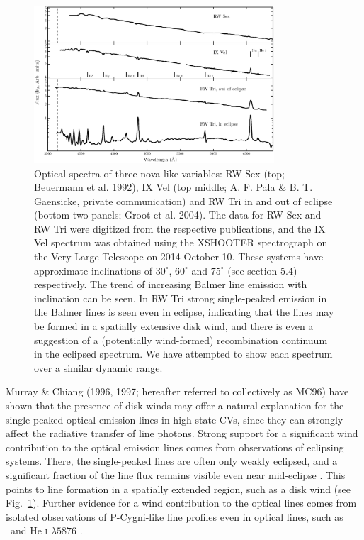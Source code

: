 \documentclass[preprint, a4paper, 11pt]{aastex}
\begin{document}
\begin{figure}	%
\centering
\includegraphics[width=0.8\textwidth]{figures/fig1.eps}
\caption{
Optical spectra of three nova-like variables: 
RW Sex (top; Beuermann et al. 1992),
IX Vel (top middle; A. F. Pala \& B. T. Gaensicke, private communication) 
and RW Tri in and out of eclipse (bottom two panels; Groot et al. 2004).
The data for RW Sex and RW Tri were digitized from the respective publications,
and the IX Vel spectrum was obtained using the XSHOOTER spectrograph 
on the Very Large Telescope on 2014 October 10.
These systems have approximate inclinations of $30^\circ$, $60^\circ$ and $75^\circ$ 
(see section 5.4) respectively. 
The trend of increasing Balmer line emission with inclination can be seen.
In RW Tri strong single-peaked emission in the Balmer lines is seen even
in eclipse, indicating that the lines may be formed in a spatially
extensive disk wind, and there is even a suggestion 
of a (potentially wind-formed) recombination continuum in the eclipsed
spectrum. We have attempted to show each spectrum over a similar dynamic range.
}
\label{novalikes}
\end{figure}

Murray \& Chiang (1996, 1997; hereafter referred to collectively as MC96)\nocite{MC96, MC97} 
have shown that the presence of disk winds may
offer a natural explanation for the single-peaked optical emission lines in
high-state CVs, since they can strongly affect the radiative transfer
of line photons. Strong support for a significant wind contribution to the
optical emission lines comes from observations of eclipsing
systems. There, the single-peaked lines are often only weakly
eclipsed, and a significant fraction of the line flux remains visible
even near mid-eclipse \citep[e.g.][]{baptista2000,groot2004}. 
This points to line formation in a spatially
extended region, such as a disk wind (see Fig.~\ref{novalikes}).
Further evidence for a wind contribution to the optical lines comes
from isolated observations of P-Cygni-like line profiles even in optical
lines, such as \ha\ and He \textsc{i} $\lambda5876$ \citep{patterson1996, RN98, kafka2004}.
\end{document}
